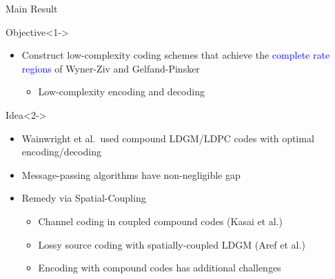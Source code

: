 \documentclass[10pt,presentation]{beamer}
\begin{document}
\begin{frame}{Main Result}
  \begin{block}{Objective}<1->
    \begin{itemize}
    \item Construct {\blue low-complexity} coding schemes that achieve the \textcolor{blue}{complete rate regions} of Wyner-Ziv and Gelfand-Pinsker \vspace{0.1cm}
      \begin{itemize}
      \item Low-complexity encoding and decoding
      \end{itemize}
    \end{itemize}
  \end{block}
  \vspace{0.1cm}
  \begin{block}{Idea}<2->
    \begin{itemize}
    \item Wainwright et al.~used compound LDGM/LDPC codes with \alert{optimal encoding/decoding}\vspace{0.1cm}
    \item Message-passing algorithms have \alert{non-negligible gap}\vspace{0.1cm}
    \item<3-> Remedy via {\blue Spatial-Coupling}
      \begin{itemize}
      \item Channel coding in coupled compound codes (Kasai et al.)
      \item Lossy source coding with spatially-coupled LDGM (Aref et al.)
      \item Encoding with compound codes has additional challenges
      \end{itemize}
    \end{itemize}
  \end{block}
\end{frame}
\end{document}
